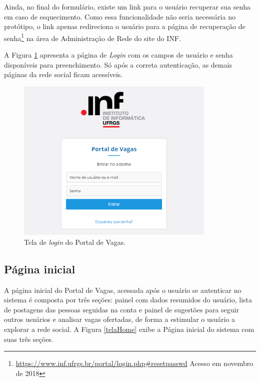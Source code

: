 Ainda, no final do formulário, existe um link para o usuário recuperar sua senha em caso de esquecimento. Como essa funcionalidade não seria necessária no protótipo, o link apenas redireciona o usuário para a página de recuperação de senha\footnote{\url{https://www.inf.ufrgs.br/portal/login.php\#resetpasswd} Acesso em novembro de 2018} na área de Administração de Rede do site do INF.

A Figura \ref{telaLoginImg} apresenta a página de \textit{Login} com os campos de usuário e senha disponíveis para preenchimento. Só após a correta autenticação, as demais páginas da rede social ficam acessíveis.

\begin{figure}[h]
    \caption{Tela de \textit{login} do Portal de Vagas.}
       	\begin{center}
            \includegraphics[width=0.85\textwidth]{figuras/tela_login.png}
        \end{center}
    \label{telaLoginImg}
\end{figure}

\subsection{Página inicial}
\label{PDVFunFeed}

A página inicial do Portal de Vagas, acessada após o usuário se autenticar no sistema é composta por três seções: painel com dados resumidos do usuário, lista de postagens das pessoas seguidas na conta e painel de sugestões para seguir outros usuários e analisar vagas ofertadas, de forma a estimular o usuário a explorar a rede social. A Figura \ref{telaHome} exibe a Página inicial do sistema com suas três seções.

